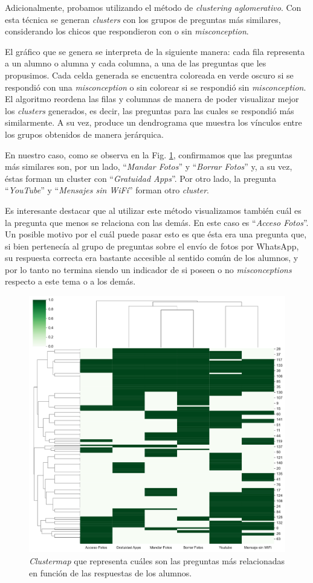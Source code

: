 Adicionalmente, probamos utilizando el método de \textit{clustering aglomerativo}. Con esta técnica se generan \textit{clusters} con los grupos de preguntas más similares, considerando los chicos que respondieron con o sin \textit{misconception}.

El gráfico que se genera se interpreta de la siguiente manera: cada fila representa a un alumno o alumna y cada columna, a una de las preguntas que les propusimos. Cada celda generada se encuentra coloreada en verde oscuro si se respondió con una \textit{misconception} o sin colorear si se respondió sin \textit{misconception}. El algoritmo reordena las filas y columnas de manera de poder visualizar mejor los \textit{clusters} generados, es decir, las preguntas para las cuales se respondió más similarmente. A su vez, produce un dendrograma que muestra los vínculos entre los grupos obtenidos de manera jerárquica. 

En nuestro caso, como se observa en la Fig. \ref{fig:analisis31}, confirmamos que las preguntas más similares son, por un lado, ``\textit{Mandar Fotos}'' y ``\textit{Borrar Fotos}'' y, a su vez, éstas forman un cluster con ``\textit{Gratuidad Apps}''. Por otro lado, la pregunta ``\textit{YouTube}'' y ``\textit{Mensajes sin WiFi}'' forman otro \textit{cluster}.

Es interesante destacar que al utilizar este método visualizamos también cuál es la pregunta que menos se relaciona con las demás. En este caso es ``\textit{Acceso Fotos}''. Un posible motivo por el cuál puede pasar esto es que ésta era una pregunta que, si bien pertenecía al grupo de preguntas sobre el envío de fotos por WhatsApp, su respuesta correcta era bastante accesible al sentido común de los alumnos, y por lo tanto no termina siendo un indicador de si poseen o no \textit{misconceptions} respecto a este tema o a los demás.

\begin{figure}[h]
    \centering
    \includegraphics[width=1\textwidth]{images_analisis/31.pdf}
    \caption{\textit{Clustermap} que representa cuáles son las preguntas más relacionadas en función de las respuestas de los alumnos.   }
    \label{fig:analisis31}
\end{figure}